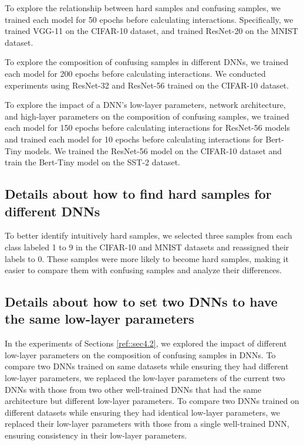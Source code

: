 \documentclass[10pt,twocolumn,letterpaper]{article}
\begin{document}
To explore the relationship between hard samples and confusing samples, we trained each model for 50 epochs before calculating interactions. Specifically, we trained VGG-11 on the CIFAR-10 dataset, and trained ResNet-20 on the MNIST dataset.

To explore the composition of confusing samples in different DNNs, we trained each model for 200 epochs before calculating interactions. We conducted experiments using ResNet-32 and ResNet-56 trained on the CIFAR-10 dataset.

To explore the impact of a DNN's low-layer parameters, network architecture, and high-layer parameters on the composition of confusing samples, we trained each model for 150 epochs before calculating interactions for ResNet-56 models and trained each model for 10 epochs before calculating interactions for Bert-Tiny models. We trained the ResNet-56 model on the CIFAR-10 dataset and train the Bert-Tiny model on the SST-2 dataset.


\subsection{Details about how to find hard samples for different DNNs}\label{appendix-sec-hard-samples}
To better identify intuitively hard samples, we selected three samples from each class labeled 1 to 9 in the CIFAR-10 and MNIST datasets and reassigned their labels to 0. These samples were more likely to become hard samples, making it easier to compare them with confusing samples and analyze their differences.

\subsection{Details about how to set two DNNs to have the same low-layer parameters}\label{appendix-sec-fix-low-layer-parameters}
In the experiments of Sections \ref{ref::sec4.2}, we explored the impact of different low-layer parameters on the composition of confusing samples in DNNs.  To compare two DNNs trained on same datasets while ensuring they had different low-layer parameters, we replaced the low-layer parameters of the current two DNNs with those from two other well-trained DNNs that had the same architecture but different low-layer parameters.  To compare two DNNs trained on different datasets while ensuring they had identical low-layer parameters, we replaced their low-layer parameters with those from a single well-trained DNN, ensuring consistency in their low-layer parameters.
\end{document}
